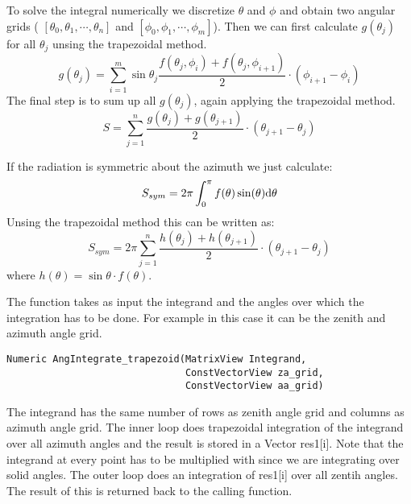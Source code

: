 To solve the integral numerically we discretize $\theta$ and $\phi$ and obtain two angular grids ( $[\theta_0, \theta_1, \cdots, \theta_n]$  and $[\phi_0, \phi_1, \cdots, \phi_m]$). 
Then we can first calculate $g(\theta_j)$ for all $\theta_j$ unsing the trapezoidal method.
\begin{equation}
  g(\theta_j) = \sum_{i=1}^m \sin\theta_j \frac{f(\theta_j, \phi_i) + f(\theta_j, \phi_{i+1})}{2} \cdot (\phi_{i+1} - \phi_i)  
\end{equation}
The final step is to sum up all $g(\theta_j)$, again applying the trapezoidal method.
\begin{equation}
  S = \sum_{j=1}^n \frac{g(\theta_j) + g(\theta_{j+1})}{2} \cdot  (\theta_{j+1} - \theta_j)  
\end{equation}

If the radiation is symmetric about the azimuth we just calculate:
\begin{equation}
  S_{sym} = 2\pi \int_0^{\pi} f(\theta) \sin(\theta) \mathrm{d} \theta 
\end{equation}
Unsing the trapezoidal method this can be written as:
\begin{equation}
  S_{sym} =  2\pi \sum_{j=1}^n \frac{h(\theta_j) + h(\theta_{j+1})}{2} \cdot  (\theta_{j+1} - \theta_j)  
\end{equation}
where $h(\theta) = \sin\theta\cdot f(\theta)$.
 
\vspace{2ex}



The function   takes as input the integrand and the angles over which
the integration has to be done. For example in this case it can be the
zenith and azimuth angle
grid.
\begin{verbatim}  
Numeric AngIntegrate_trapezoid(MatrixView Integrand,
                               ConstVectorView za_grid,
                               ConstVectorView aa_grid)
\end{verbatim}
The integrand has the same number of rows as zenith angle grid
and columns as azimuth angle grid.  The inner loop does trapezoidal
integration of the integrand over all azimuth angles and the result is
stored in a Vector  res1[i]. Note that the integrand at every point
has to be multiplied with 
since we are integrating over solid angles.  The outer loop 
does an integration of res1[i] over all zentih angles.  The result of
this is returned back to the calling function.  


